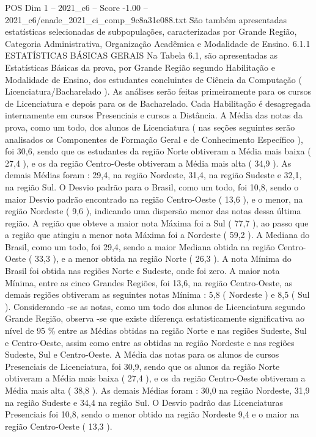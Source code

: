 \begin{textsample}{POS Dim 1 – 2021\_c6 – Score -1.00 – 2021\_c6/enade\_2021\_ci\_comp\_9c8a31e088.txt}
São também apresentadas estatísticas selecionadas de subpopulações, caracterizadas por Grande Região, Categoria Administrativa, Organização Acadêmica e Modalidade de Ensino. 6.1.1 ESTATÍSTICAS BÁSICAS GERAIS Na Tabela 6.1, são apresentadas as Estatísticas Básicas da prova, por Grande Região segundo Habilitação e Modalidade de Ensino, dos estudantes concluintes de Ciência da Computação ( Licenciatura/Bacharelado ).
As análises serão feitas primeiramente para os cursos de Licenciatura e depois para os de Bacharelado.
Cada Habilitação é desagregada internamente em cursos Presenciais e cursos a Distância.
A Média das notas da prova, como um todo, dos alunos de Licenciatura ( nas seções seguintes serão analisados os Componentes de Formação Geral e de Conhecimento Específico ), foi 30,6, sendo que os estudantes da região Norte obtiveram a Média mais baixa ( 27,4 ), e os da região Centro-Oeste obtiveram a Média mais alta ( 34,9 ).
As demais Médias foram : 29,4, na região Nordeste, 31,4, na região Sudeste e 32,1, na região Sul.
O Desvio padrão para o Brasil, como um todo, foi 10,8, sendo o maior Desvio padrão encontrado na região Centro-Oeste ( 13,6 ), e o menor, na região Nordeste ( 9,6 ), indicando uma dispersão menor das notas dessa última região.
A região que obteve a maior nota Máxima foi a Sul ( 77,7 ), ao passo que a região que atingiu a menor nota Máxima foi a Nordeste ( 59,2 ).
A Mediana do Brasil, como um todo, foi 29,4, sendo a maior Mediana obtida na região Centro-Oeste ( 33,3 ), e a menor obtida na região Norte ( 26,3 ).
A nota Mínima do Brasil foi obtida nas regiões Norte e Sudeste, onde foi zero.
A maior nota Mínima, entre as cinco Grandes Regiões, foi 13,6, na região Centro-Oeste, as demais regiões obtiveram as seguintes notas Mínima : 5,8 ( Nordeste ) e 8,5 ( Sul ).
Considerando -se as notas, como um todo dos alunos de Licenciatura segundo Grande Região, observa -se que existe diferença estatisticamente significativa ao nível de 95 \% entre as Médias obtidas na região Norte e nas regiões Sudeste, Sul e Centro-Oeste, assim como entre as obtidas na região Nordeste e nas regiões Sudeste, Sul e Centro-Oeste.
A Média das notas para os alunos de cursos Presenciais de Licenciatura, foi 30,9, sendo que os alunos da região Norte obtiveram a Média mais baixa ( 27,4 ), e os da região Centro-Oeste obtiveram a Média mais alta ( 38,8 ).
As demais Médias foram : 30,0 na região Nordeste, 31,9 na região Sudeste e 34,4 na região Sul.
O Desvio padrão das Licenciaturas Presenciais foi 10,8, sendo o menor obtido na região Nordeste 9,4 e o maior na região Centro-Oeste ( 13,3 ).

\end{textsample}
